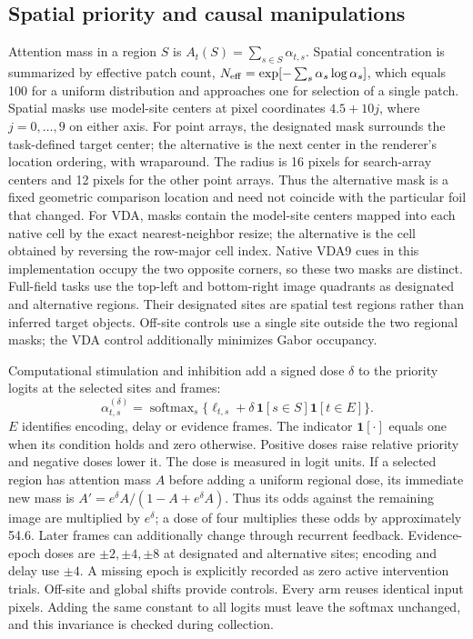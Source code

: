 \documentclass[11pt]{article}
\begin{document}
\subsection{Spatial priority and causal manipulations}
Attention mass in a region $S$ is $A_t(S)=\sum_{s\in S}\alpha_{t,s}$. Spatial concentration is summarized by effective patch count, $N_{\rm eff}=\exp[-\sum_s\alpha_s\log\alpha_s]$, which equals 100 for a uniform distribution and approaches one for selection of a single patch. Spatial masks use model-site centers at pixel coordinates $4.5+10j$, where $j=0,\ldots,9$ on either axis. For point arrays, the designated mask surrounds the task-defined target center; the alternative is the next center in the renderer's location ordering, with wraparound. The radius is 16 pixels for search-array centers and 12 pixels for the other point arrays. Thus the alternative mask is a fixed geometric comparison location and need not coincide with the particular foil that changed. For VDA, masks contain the model-site centers mapped into each native cell by the exact nearest-neighbor resize; the alternative is the cell obtained by reversing the row-major cell index. Native VDA9 cues in this implementation occupy the two opposite corners, so these two masks are distinct. Full-field tasks use the top-left and bottom-right image quadrants as designated and alternative regions. Their designated sites are spatial test regions rather than inferred target objects. Off-site controls use a single site outside the two regional masks; the VDA control additionally minimizes Gabor occupancy.

Computational stimulation and inhibition add a signed dose $\delta$ to the priority logits at the selected sites and frames:
\begin{equation}
 \alpha^{(\delta)}_{t,s}=\operatorname{softmax}_s\{\ell_{t,s}+\delta\,\mathbf 1[s\in S]\mathbf 1[t\in E]\}.
\end{equation}
$E$ identifies encoding, delay or evidence frames. The indicator $\mathbf 1[\cdot]$ equals one when its condition holds and zero otherwise. Positive doses raise relative priority and negative doses lower it. The dose is measured in logit units. If a selected region has attention mass $A$ before adding a uniform regional dose, its immediate new mass is $A'=e^\delta A/(1-A+e^\delta A)$. Thus its odds against the remaining image are multiplied by $e^\delta$; a dose of four multiplies these odds by approximately 54.6. Later frames can additionally change through recurrent feedback. Evidence-epoch doses are $\pm2,\pm4,\pm8$ at designated and alternative sites; encoding and delay use $\pm4$. A missing epoch is explicitly recorded as zero active intervention trials. Off-site and global shifts provide controls. Every arm reuses identical input pixels. Adding the same constant to all logits must leave the softmax unchanged, and this invariance is checked during collection.
\end{document}
